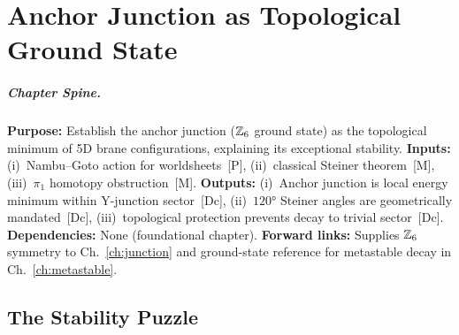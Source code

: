 
\chapter{Anchor Junction as Topological Ground State}
\label{ch:anchor}


\begin{abstract}
Why is the anchor junction stable? Experimental bounds exceed $\tau_p > 10^{34}$ years, yet no
conventional symmetry principle mandates this. In the EDC framework, anchor stability
emerges from topology: the anchor junction corresponds to a \emph{topological anchor}---a locally
minimizing Y-junction configuration of 5D worldsheets that cannot decay via continuous
deformations.
\end{abstract}

\paragraph{Chapter Spine.}
\textbf{Purpose:} Establish the anchor junction ($\mathbb{Z}_6$ ground state) as the
topological minimum of 5D brane configurations, explaining its exceptional
stability.
\textbf{Inputs:} (i)~Nambu--Goto action for worldsheets~[P], (ii)~classical
Steiner theorem~[M], (iii)~$\pi_1$ homotopy obstruction~[M].
\textbf{Outputs:} (i)~Anchor junction is local energy minimum within Y-junction
sector~[Dc], (ii)~$120°$ Steiner angles are geometrically mandated~[Dc],
(iii)~topological protection prevents decay to trivial sector~[Dc].
\textbf{Dependencies:} None (foundational chapter).
\textbf{Forward links:} Supplies $\mathbb{Z}_6$ symmetry to Ch.~\ref{ch:junction} and
ground-state reference for metastable decay in Ch.~\ref{ch:metastable}.

\section{The Stability Puzzle}
\label{sec:anchor:puzzle}

